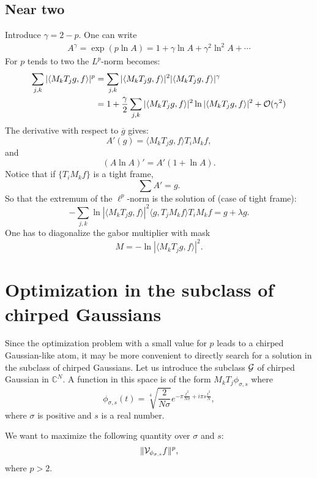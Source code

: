 \documentclass[11pt]{article}
\newcommand{\C}{\mathbb{C}}
\begin{document}
\subsection{Near two}
Introduce $\gamma=2-p$. One can write
\begin{align}
A^\gamma=\exp(p\ln A)=1+\gamma\ln A+\gamma^2\ln^2 A+\cdots
\end{align}
For $p$ tends to two the $L^p$-norm becomes:
\begin{align*}
\sum_{j,k}|\langle M_kT_jg , f\rangle |^p&=\sum_{j,k}|\langle M_kT_jg , f\rangle |^2 |\langle M_kT_jg , f\rangle |^\gamma\\
&=1+\frac{\gamma}{2} \sum_{j,k}|\langle M_kT_jg , f\rangle |^2 \ln|\langle M_kT_jg , f\rangle |^2+{\cal O}(\gamma^2)
\end{align*}
The derivative with respect to $\overline{g}$ gives: 
$$A'(g)=\langle M_kT_jg , f\rangle T_iM_kf,
$$
and
$$(A\ln A)'=A'(1+\ln A).
$$
Notice that if $\{T_iM_kf\}$ is a tight frame,
$$\sum A'=g.
$$
So that the extremum of the $\ell^p$-norm is the solution of (case of tight frame):
$$-\sum_{j,k}\ln|\langle M_kT_jg , f\rangle |^2\langle g , T_jM_kf\rangle T_iM_kf=g+\lambda g.
$$
One has to diagonalize the gabor multiplier with mask
$$M=-\ln|\langle M_kT_jg , f\rangle |^2.
$$

\section{Optimization in the subclass of chirped Gaussians}

Since the optimization problem with a small value for $p$ leads to a chirped Gaussian-like atom, it may be more convenient to directly search for a solution in the subclass of chirped Gaussians. Let us introduce the subclass $\cal G$ of chirped Gaussian in $\C^N$. A function in this space is of the form $M_kT_j\phi_{\sigma,s}$ where
\begin{equation}\label{Gaussianeq}
\phi_{\sigma,s}(t)=\sqrt[4]{\frac{2}{N\sigma}}e^{-\pi\frac{t^2}{N\sigma}+i \pi s \frac{t^2}{N}},
\end{equation}
where $\sigma$ is positive and $s$ is a real number.

We want to maximize the following quantity over $\sigma$ and $s$:
$$\|{\cal V}_{\phi_{\sigma,s}}f\|^p,
$$
where $p>2$.
\end{document}
